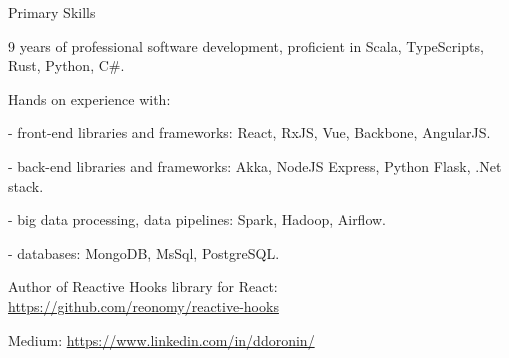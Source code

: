 \documentclass{resume}
\begin{document}

\begin{rSection}{Primary Skills}

\item 9 years of professional software development, proficient in Scala, TypeScripts, Rust, Python, C\#.
\item Hands on experience with:
\item - front-end libraries and frameworks: 
React, RxJS, Vue, Backbone, AngularJS.

\item - back-end libraries and frameworks: 
Akka, NodeJS Express, Python Flask, .Net stack.

\item - big data processing, data pipelines:
Spark, Hadoop, Airflow.

\item - databases:
MongoDB, MsSql, PostgreSQL.

\item Author of Reactive Hooks library for React:
\url{https://github.com/reonomy/reactive-hooks}

\item Medium: \url{https://www.linkedin.com/in/ddoronin/}

\end{rSection}

\end{document}
